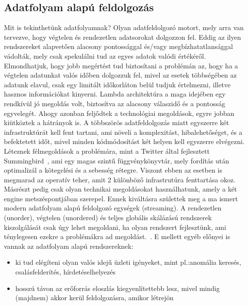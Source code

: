 \documentclass[a4paper,12pt]{article}
\begin{document}
\subsection{Adatfolyam alapú feldolgozás}
Mit is tekinthetünk adatfolyamnak? Olyan adatfeldolgozó motort, mely arra van tervezve, hogy végtelen és rendezetlen adatsorokat dolgozzon fel. Eddig az ilyen rendszereket alapvetően alacsony pontossággal és/vagy megbízhatatlansággal vádolták, mely csak spekulálni tud az egyes adatok valódi értékéről. Elmondhatjuk, hogy jobb megértést tud biztosítani a problémán az, hogy ha a végtelen adatunkat valós időben dolgozzuk fel, mivel az esetek többségében az adatunk elavul, csak egy limitált időkorláton belül tudjuk értelmezni, illetve hasznos információkat kinyerni. 
Lambda architektúra a maga idejében egy rendkívül jó megoldás volt, biztosítva az alacsony válaszidő és a pontosság egyvelegét. Ahogy azonban feljődtek a technológiai megoldások, egyre jobban kiütköztek a hátrányok is. A többszörös adatfeldolgozás miatt egyszerre két infrastruktúrát kell fent tartani, ami növeli a komplexitást, hibalehetőséget, és a befektetett időt, mivel minden kódmódosítást két helyen kell egyszerre elvégezni. Léteznek félmegoldások a problémára, mint a Twitter által fejlesztett Summingbird~\cite{summingbird}, ami egy magas szintű függvénykönyvtár, mely fordítás után optimalizál a kötegelési és a sebesség rétegre. Viszont ebben az esetben is megmarad az operatív teher, amit 2 különböző infrastrutúra fenttartása okoz. Másrészt pedig csak olyan technikai megoldásokat használhatunk, amely a két engine metszéspontjában szerepel. \linebreak
Ennek kiváltásra születtek meg a ma ismert modern adatfolyam alapú feldolgozó egységek (streaming). A rendezetlen (unorder), végtelen (unordered) és teljes globális skálázású rendszerek kiszolgálását csak úgy lehet megoldani, ha olyan rendszert fejlesztünk, ami ténylegesen ezekre a problémákra ad megoldást.~\cite{tyler}. E mellett egyéb előnyei is vannak az adatfolyam alapú rendszereknek: 
\begin{itemize}
\item ki tud elégíteni olyan valós idejű üzleti igényeket, mint pl.:anomália keresés, csalásfelderítés, hírdetéselhelyezés
\item hosszú távon az erőforrás eloszlás kiegyenlítettebb lesz, mivel mindig (majdnem) akkor kerül feldolgozásra, amikor létrejön
\end{itemize}
\end{document}
